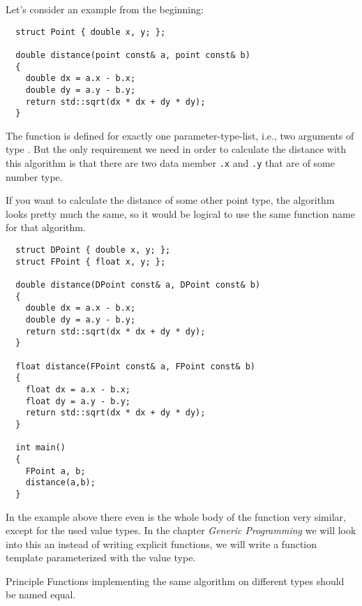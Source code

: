 \begin{example}
Let's consider an example from the beginning:
%
\begin{verbatim}
  struct Point { double x, y; };

  double distance(point const& a, point const& b)
  {
    double dx = a.x - b.x;
    double dy = a.y - b.y;
    return std::sqrt(dx * dx + dy * dy);
  }
\end{verbatim}
%
The function  is defined for exactly one parameter-type-list, i.e., two arguments of type . But the only requirement we need
in order to calculate the distance with this algorithm is that there are two data member \texttt{.x} and \texttt{.y} that are of some number type.

If you want to calculate the distance of some other point type, the algorithm looks pretty much the same, so it would be logical to use the same function
name for that algorithm.
%
\begin{verbatim}
  struct DPoint { double x, y; };
  struct FPoint { float x, y; };

  double distance(DPoint const& a, DPoint const& b)
  {
    double dx = a.x - b.x;
    double dy = a.y - b.y;
    return std::sqrt(dx * dx + dy * dy);
  }

  float distance(FPoint const& a, FPoint const& b)
  {
    float dx = a.x - b.x;
    float dy = a.y - b.y;
    return std::sqrt(dx * dx + dy * dy);
  }

  int main()
  {
    FPoint a, b;
    distance(a,b);
  }
\end{verbatim}
\end{example}

\begin{rem}
  In the example above there even is the whole body of the function very similar, except for the used value types. In the chapter \emph{Generic Programming}
  we will look into this an instead of writing explicit functions, we will write a function template parameterized with the value type.
\end{rem}

\begin{guideline}{Principle}
  Functions implementing the same algorithm on different types should be named equal.
\end{guideline}

